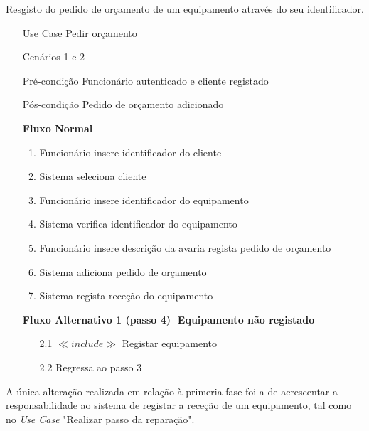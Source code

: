 \documentclass[../relatorio.tex]{subfiles}
\begin{document}
Resgisto do pedido de orçamento de um equipamento através do seu identificador.
\begin{itemize}
	\item[Use Case] {\underline{Pedir orçamento}}
	\item[Cenários] {1 e 2}
	\item[Pré-condição] {Funcionário autenticado e cliente registado}
	\item[Pós-condição] {Pedido de orçamento adicionado}
	      \begin{flushleft}
		      \textbf{Fluxo Normal}
	      \end{flushleft}
	      \begin{enumerate}
		      \item Funcionário insere identificador do cliente
              \item Sistema seleciona cliente
		      \item Funcionário insere identificador do equipamento
		      \item Sistema verifica identificador do equipamento
		      \item Funcionário insere descrição da avaria regista pedido de orçamento
		      \item Sistema adiciona pedido de orçamento
		      \item Sistema regista receção do equipamento
	      \end{enumerate}

	      \begin{flushleft}
		      \textbf{Fluxo Alternativo 1 (passo 4) [Equipamento não registado]}
	      \end{flushleft}
	      \begin{itemize}
		      \item[2.1] $\ll include \gg$ Registar equipamento
		      \item[2.2] Regressa ao passo 3
	      \end{itemize}
\end{itemize}
A única alteração realizada em relação à primeria fase foi a de acrescentar a responsabilidade ao sistema de registar a receção de 
um equipamento, tal como no \textit{Use Case} "Realizar passo da reparação".
\end{document}
